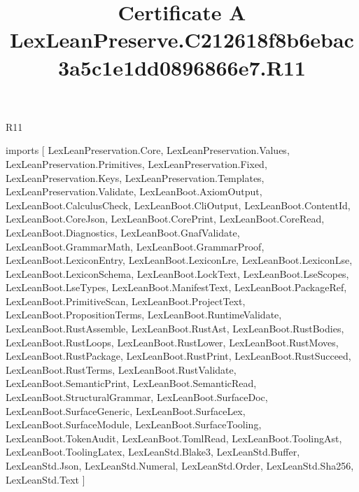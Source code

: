 \begin{lexlean}{R11}
\title{Certificate A LexLeanPreserve.C212618f8b6ebac3a5c1e1dd0896866e7.R11}
\begin{coremodule}
imports [
  LexLeanPreservation.Core,
  LexLeanPreservation.Values,
  LexLeanPreservation.Primitives,
  LexLeanPreservation.Fixed,
  LexLeanPreservation.Keys,
  LexLeanPreservation.Templates,
  LexLeanPreservation.Validate,
  LexLeanBoot.AxiomOutput,
  LexLeanBoot.CalculusCheck,
  LexLeanBoot.CliOutput,
  LexLeanBoot.ContentId,
  LexLeanBoot.CoreJson,
  LexLeanBoot.CorePrint,
  LexLeanBoot.CoreRead,
  LexLeanBoot.Diagnostics,
  LexLeanBoot.GnafValidate,
  LexLeanBoot.GrammarMath,
  LexLeanBoot.GrammarProof,
  LexLeanBoot.LexiconEntry,
  LexLeanBoot.LexiconLre,
  LexLeanBoot.LexiconLse,
  LexLeanBoot.LexiconSchema,
  LexLeanBoot.LockText,
  LexLeanBoot.LseScopes,
  LexLeanBoot.LseTypes,
  LexLeanBoot.ManifestText,
  LexLeanBoot.PackageRef,
  LexLeanBoot.PrimitiveScan,
  LexLeanBoot.ProjectText,
  LexLeanBoot.PropositionTerms,
  LexLeanBoot.RuntimeValidate,
  LexLeanBoot.RustAssemble,
  LexLeanBoot.RustAst,
  LexLeanBoot.RustBodies,
  LexLeanBoot.RustLoops,
  LexLeanBoot.RustLower,
  LexLeanBoot.RustMoves,
  LexLeanBoot.RustPackage,
  LexLeanBoot.RustPrint,
  LexLeanBoot.RustSucceed,
  LexLeanBoot.RustTerms,
  LexLeanBoot.RustValidate,
  LexLeanBoot.SemanticPrint,
  LexLeanBoot.SemanticRead,
  LexLeanBoot.StructuralGrammar,
  LexLeanBoot.SurfaceDoc,
  LexLeanBoot.SurfaceGeneric,
  LexLeanBoot.SurfaceLex,
  LexLeanBoot.SurfaceModule,
  LexLeanBoot.SurfaceTooling,
  LexLeanBoot.TokenAudit,
  LexLeanBoot.TomlRead,
  LexLeanBoot.ToolingAst,
  LexLeanBoot.ToolingLatex,
  LexLeanStd.Blake3,
  LexLeanStd.Buffer,
  LexLeanStd.Json,
  LexLeanStd.Numeral,
  LexLeanStd.Order,
  LexLeanStd.Sha256,
  LexLeanStd.Text
]


\end{coremodule}
\end{lexlean}
